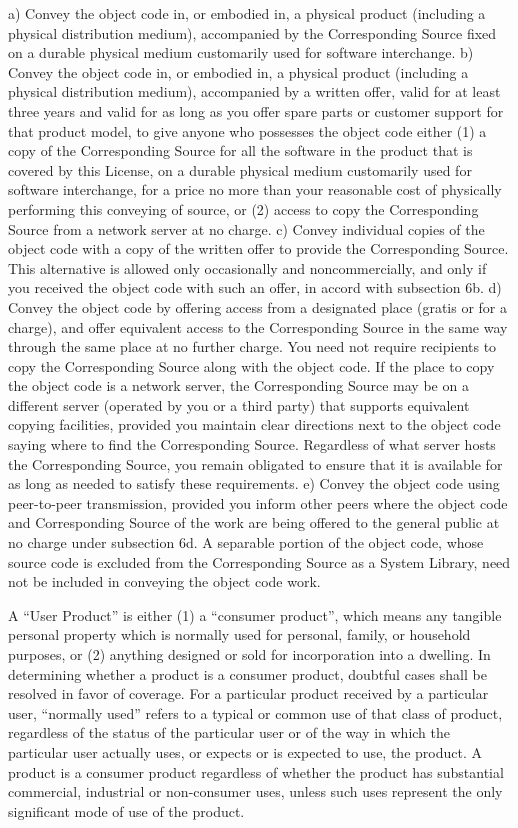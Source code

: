 \documentclass[letterpaper,12pt]{article}
\begin{document}
{a) Convey the object code in, or embodied in, a physical product (including a physical distribution medium), accompanied by the Corresponding Source fixed on a durable physical medium customarily used for software interchange.
b) Convey the object code in, or embodied in, a physical product (including a physical distribution medium), accompanied by a written offer, valid for at least three years and valid for as long as you offer spare parts or customer support for that product model, to give anyone who possesses the object code either (1) a copy of the Corresponding Source for all the software in the product that is covered by this License, on a durable physical medium customarily used for software interchange, for a price no more than your reasonable cost of physically performing this conveying of source, or (2) access to copy the Corresponding Source from a network server at no charge.
c) Convey individual copies of the object code with a copy of the written offer to provide the Corresponding Source. This alternative is allowed only occasionally and noncommercially, and only if you received the object code with such an offer, in accord with subsection 6b.
d) Convey the object code by offering access from a designated place (gratis or for a charge), and offer equivalent access to the Corresponding Source in the same way through the same place at no further charge. You need not require recipients to copy the Corresponding Source along with the object code. If the place to copy the object code is a network server, the Corresponding Source may be on a different server (operated by you or a third party) that supports equivalent copying facilities, provided you maintain clear directions next to the object code saying where to find the Corresponding Source. Regardless of what server hosts the Corresponding Source, you remain obligated to ensure that it is available for as long as needed to satisfy these requirements.
e) Convey the object code using peer-to-peer transmission, provided you inform other peers where the object code and Corresponding Source of the work are being offered to the general public at no charge under subsection 6d.
A separable portion of the object code, whose source code is excluded from the Corresponding Source as a System Library, need not be included in conveying the object code work.

A ``User Product'' is either (1) a ``consumer product'', which means any tangible personal property which is normally used for personal, family, or household purposes, or (2) anything designed or sold for incorporation into a dwelling. In determining whether a product is a consumer product, doubtful cases shall be resolved in favor of coverage. For a particular product received by a particular user, ``normally used'' refers to a typical or common use of that class of product, regardless of the status of the particular user or of the way in which the particular user actually uses, or expects or is expected to use, the product. A product is a consumer product regardless of whether the product has substantial commercial, industrial or non-consumer uses, unless such uses represent the only significant mode of use of the product.

}
\end{document}
